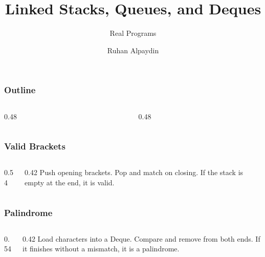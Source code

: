 \documentclass[aspectratio=169,10pt,compress]{beamer}
\title{Linked Stacks, Queues, and Deques}
\subtitle{Real Programs}
\author[Bingol]{Ruhan Alpaydin}
\institute[FCIS]{Faculty of Computer and Information Sciences\\Yeditepe University}
\date{{\tiny \hbTimeStamp}}
\begin{document}
\begin{frame}[t,fragile]\titlepage\end{frame}

\begin{frame}[t,fragile]\frametitle{Outline}
  \begin{columns}[T]
    \begin{column}{0.48\textwidth}\tableofcontents[sections={1-3},hideallsubsections]\end{column}
    \begin{column}{0.48\textwidth}\tableofcontents[sections={4-5},hideallsubsections]\end{column}
  \end{columns}
\end{frame}

\begin{frame}[t,fragile]\frametitle{Valid Brackets}
  \begin{columns}[T]
    \begin{column}{0.54\textwidth}
    \end{column}
    \begin{column}{0.42\textwidth}
      \small
      Push opening brackets. Pop and match on closing.
      If the stack is empty at the end, it is valid.
    \end{column}
  \end{columns}
\end{frame}

\begin{frame}[t,fragile]\frametitle{Palindrome}
  \begin{columns}[T]
    \begin{column}{0.54\textwidth}
    \end{column}
    \begin{column}{0.42\textwidth}
      \small
      Load characters into a Deque. Compare and remove from both ends.
      If it finishes without a mismatch, it is a palindrome.
    \end{column}
  \end{columns}
\end{frame}
\end{document}
